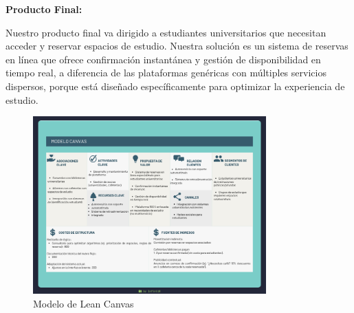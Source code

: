 \documentclass{article}
\begin{document}
\noindent\textbf{Producto Final:}

Nuestro producto final va dirigido a estudiantes universitarios que necesitan acceder y reservar espacios de estudio. Nuestra solución es un sistema de reservas en línea que ofrece confirmación instantánea y gestión de disponibilidad en tiempo real, a diferencia de las plataformas genéricas con múltiples servicios dispersos, porque está diseñado específicamente para optimizar la experiencia de estudio.

\begin{figure}[ht]
  \centering
  \includegraphics[width=0.8\textwidth]{assets/lean.png}
  \caption{Modelo de Lean Canvas}
  \label{fig:example-image}
\end{figure}
\end{document}
